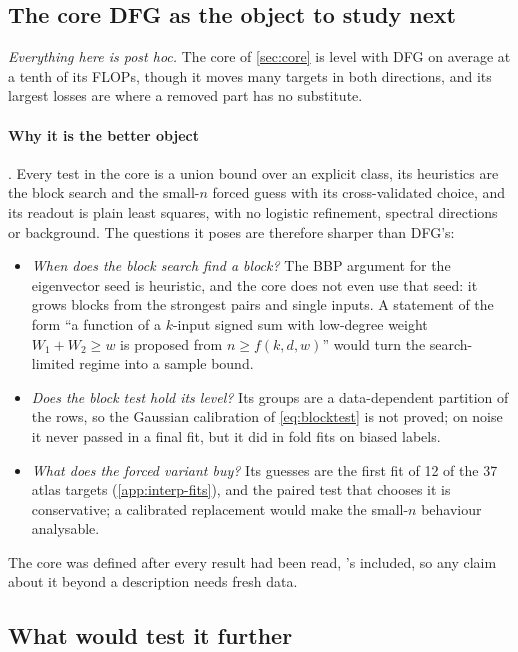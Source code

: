 \subsection{The core DFG as the object to study next}\label{sec:disc-core}

\emph{Everything here is post hoc.} The core of \cref{sec:core} is level with DFG on average at a tenth of its FLOPs, though it moves many targets in both directions, and its largest losses are where a removed part has no substitute.

\paragraph{Why it is the better object} . Every test in the core is a union bound over an explicit class, its heuristics are the block search and the small-$n$ forced guess with its cross-validated choice, and its readout is plain least squares, with no logistic refinement, spectral directions or background. The questions it poses are therefore sharper than DFG's:
\begin{itemize}
\item \emph{When does the block search find a block?} The BBP argument for the eigenvector seed is heuristic, and the core does not even use that seed: it grows blocks from the strongest pairs and single inputs. A statement of the form ``a function of a $k$-input signed sum with low-degree weight $W_1+W_2\ge w$ is proposed from $n\ge f(k,d,w)$'' would turn the search-limited regime into a sample bound.
\item \emph{Does the block test hold its level?} Its groups are a data-dependent partition of the rows, so the Gaussian calibration of \cref{eq:blocktest} is not proved; on noise it never passed in a final fit, but it did in fold fits on biased labels.
\item \emph{What does the forced variant buy?} Its guesses are the first fit of 12 of the 37 atlas targets (\cref{app:interp-fits}), and the paired test that chooses it is conservative; a calibrated replacement would make the small-$n$ behaviour analysable.
\end{itemize}
The core was defined after every result had been read, 's included, so any claim about it beyond a description needs fresh data.

\subsection{What would test it further}\label{sec:disc-next}

